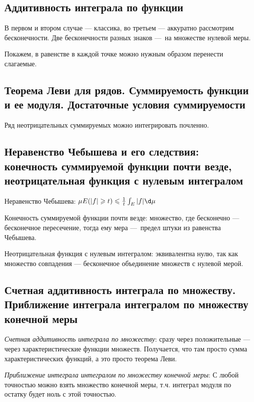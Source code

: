 \documentclass[12pt, a4paper, oneside]{memoir}
\begin{document}
\subsection{Аддитивность интеграла по функции}

В первом и втором случае — классика, во третьем — аккуратно рассмотрим бесконечности.
Две бесконечности разных знаков — на множестве нулевой меры.

Покажем, в равенстве в каждой точке можно нужным образом перенести слагаемые.

\subsection{Теорема Леви для рядов.
Суммируемость функции и ее модуля. Достаточные условия суммируемости}


\begin{theorem}

    Ряд неотрицательных суммируемых можно интегрировать почленно.
\end{theorem}

\subsection{Неравенство Чебышева и его следствия: конечность суммируемой функции почти везде, неотрицательная функция с нулевым интегралом}

Неравенство Чебышева: $\mu E(|f| \geqslant t) \leqslant \frac{1}{t} \int_E |f| \d \mu$

Конечность суммируемой функции почти везде: множество, где бесконечно — бесконечное пересечение, тогда ему мера — предел штуки из равенства Чебышева.

Неотрицательная функция с нулевым интегралом: эквивалентна нулю, так как множество совпадения — бесконечное объединение множеств с нулевой мерой.


\subsection{Счетная аддитивность интеграла по множеству.
Приближение интеграла интегралом по множеству конечной меры}


\textit{Счетная аддитивность интеграла по множеству}: 
сразу через положительные — через характеристические функции множеств. Получается, что там просто сумма характеристических функций, а это просто теорема Леви.

\textit{Приближение интеграла интегралом по множеству конечной меры}:
С любой точностью можно взять множество конечной меры, т.ч. интеграл модуля по остатку будет ноль с этой точностью.
\end{document}
